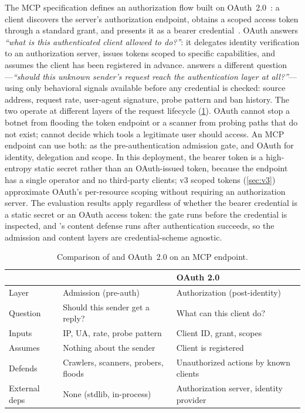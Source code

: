 \documentclass[10pt,twocolumn]{article}
\begin{document}
The MCP specification defines an authorization flow built on
OAuth~2.0~\citep{rfc6749,mcpauth2025}: a client discovers the server's
authorization endpoint, obtains a scoped access token through a standard grant,
and presents it as a bearer credential~\citep{rfc6750}. OAuth answers
\emph{``what is this authenticated client allowed to do?''}: it delegates
identity verification to an authorization server, issues tokens scoped to
specific capabilities, and assumes the client has been registered in advance.
\sys{} answers a different question---\emph{``should this unknown sender's
request reach the authentication layer at all?''}---using only behavioral
signals available before any credential is checked: source address, request
rate, user-agent signature, probe pattern and ban history. The two operate
at different layers of the request lifecycle (\cref{tab:oauthcmp}). OAuth
cannot stop a botnet from flooding the token endpoint or a scanner from
probing paths that do not exist; \sys{} cannot decide which tools a
legitimate user should access. An MCP endpoint can use both: \sys{} as the
pre-authentication admission gate, and OAuth for identity, delegation and
scope. In this deployment, the bearer token is a high-entropy static secret
rather than an OAuth-issued token, because the endpoint has a single
operator and no third-party clients; v3 scoped tokens
(\cref{sec:v3}) approximate OAuth's per-resource scoping without requiring
an authorization server. The evaluation results apply regardless of whether
the bearer credential is a static secret or an OAuth access token: the gate
runs before the credential is inspected, and \bastion{}'s content defense
runs after authentication succeeds, so the admission and content layers are
credential-scheme agnostic.

\begin{table}[!htbp]
\centering\small
\caption{Comparison of \sys{} and OAuth~2.0 on an MCP endpoint.}
\label{tab:oauthcmp}
\begin{tabularx}{\columnwidth}{@{}l X X@{}}
\toprule
 & \textbf{\sys{}} & \textbf{OAuth 2.0} \\
\midrule
Layer       & Admission (pre-auth)            & Authorization (post-identity) \\
Question    & Should this sender get a reply?  & What can this client do? \\
Inputs      & IP, UA, rate, probe pattern      & Client ID, grant, scopes \\
Assumes     & Nothing about the sender         & Client is registered \\
Defends     & Crawlers, scanners, probers, floods & Unauthorized actions by known clients \\
External deps & None (stdlib, in-process)      & Authorization server, identity provider \\
\bottomrule
\end{tabularx}
\end{table}
\end{document}
